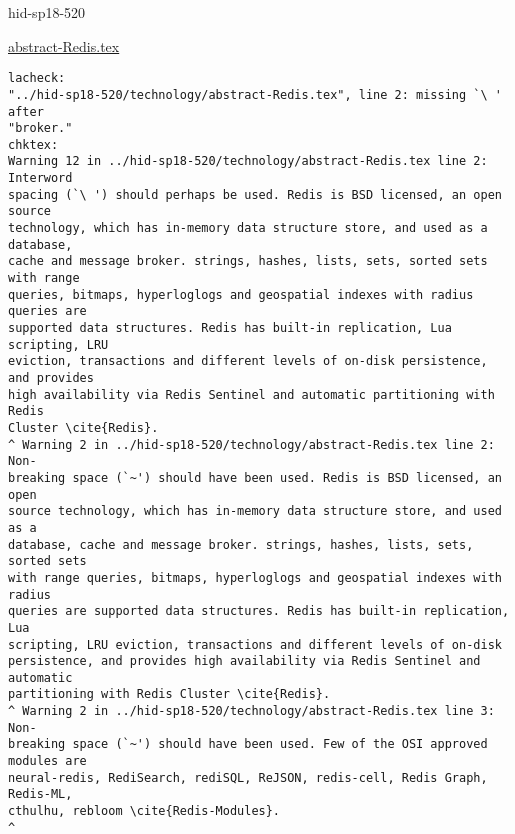 

\begin{IU}

hid-sp18-520

\href{https://github.com/cloudmesh-community/hid-sp18-520/blob/master//technology/abstract-Redis.tex}{abstract-Redis.tex}

\begin{tiny}
\begin{verbatim}
lacheck:
"../hid-sp18-520/technology/abstract-Redis.tex", line 2: missing `\ ' after
"broker."
chktex:
Warning 12 in ../hid-sp18-520/technology/abstract-Redis.tex line 2: Interword
spacing (`\ ') should perhaps be used. Redis is BSD licensed, an open source
technology, which has in-memory data structure store, and used as a database,
cache and message broker. strings, hashes, lists, sets, sorted sets with range
queries, bitmaps, hyperloglogs and geospatial indexes with radius queries are
supported data structures. Redis has built-in replication, Lua scripting, LRU
eviction, transactions and different levels of on-disk persistence, and provides
high availability via Redis Sentinel and automatic partitioning with Redis
Cluster \cite{Redis}.
^ Warning 2 in ../hid-sp18-520/technology/abstract-Redis.tex line 2: Non-
breaking space (`~') should have been used. Redis is BSD licensed, an open
source technology, which has in-memory data structure store, and used as a
database, cache and message broker. strings, hashes, lists, sets, sorted sets
with range queries, bitmaps, hyperloglogs and geospatial indexes with radius
queries are supported data structures. Redis has built-in replication, Lua
scripting, LRU eviction, transactions and different levels of on-disk
persistence, and provides high availability via Redis Sentinel and automatic
partitioning with Redis Cluster \cite{Redis}.
^ Warning 2 in ../hid-sp18-520/technology/abstract-Redis.tex line 3: Non-
breaking space (`~') should have been used. Few of the OSI approved modules are
neural-redis, RediSearch, rediSQL, ReJSON, redis-cell, Redis Graph, Redis-ML,
cthulhu, rebloom \cite{Redis-Modules}.
^
\end{verbatim}
\end{tiny}
\end{IU}



